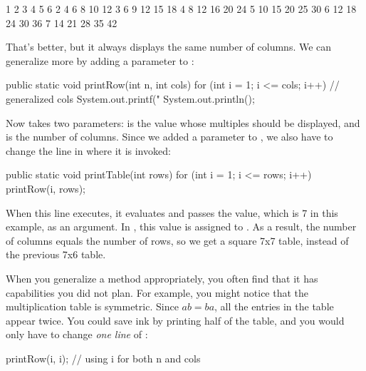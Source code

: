 \begin{stdout}
   1   2   3   4   5   6
   2   4   6   8  10  12
   3   6   9  12  15  18
   4   8  12  16  20  24
   5  10  15  20  25  30
   6  12  18  24  30  36
   7  14  21  28  35  42
\end{stdout}

That's better, but it always displays the same number of columns.
We can generalize more by adding a parameter to :

\begin{code}
public static void printRow(int n, int cols) {
    for (int i = 1; i <= cols; i++) {     // generalized cols
        System.out.printf("%
    }
    System.out.println();
}
\end{code}

Now  takes two parameters:  is the value whose multiples should be displayed, and  is the number of columns.
Since we added a parameter to , we also have to change the line in  where it is invoked:

\begin{code}
public static void printTable(int rows) {
    for (int i = 1; i <= rows; i++) {
        printRow(i, rows);
    }
}
\end{code}

When this line executes, it evaluates  and passes the value, which is 7 in this example, as an argument.
In , this value is assigned to .
As a result, the number of columns equals the number of rows, so we get a square 7x7 table, instead of the previous 7x6 table.


When you generalize a method appropriately, you often find that it has capabilities you did not plan.
For example, you might notice that the multiplication table is symmetric.
Since $ab = ba$, all the entries in the table appear twice.
You could save ink by printing half of the table, and you would only have to change {\em one line} of :

\begin{code}
        printRow(i, i);  // using i for both n and cols
\end{code}

